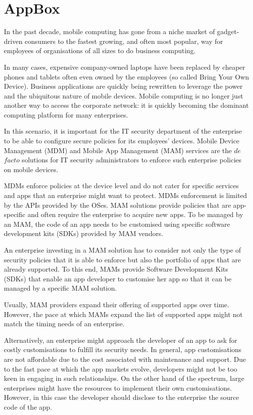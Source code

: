 \chapter{AppBox}
In the past decade, mobile computing has gone from a niche market of gadget-driven consumers to the fastest growing, and often most popular, way for employees of organisations of all sizes to do business computing. 

In many cases, expensive company-owned laptops have been replaced by cheaper phones and tablets often even owned by the employees (so called Bring Your Own Device). Business applications are quickly being rewritten to leverage the power and the ubiquitous nature of mobile devices. Mobile computing is no longer just another way to access the corporate network: it is quickly becoming the dominant computing platform for many enterprises.
  
In this scenario, it is important for the IT security department of the enterprise to be able to configure secure policies for its employees' devices. Mobile Device Management (MDM) and Mobile App Management (MAM) services are the $de$ $facto$ solutions for IT security administrators to enforce such enterprise policies on mobile devices.

MDMs enforce policies at the device level and do not cater for specific services and apps that an enterprise might want to protect. MDMs enforcement is  limited by the APIs  provided by the OSes. MAM solutions provide policies that are app-specific and often require the enterprise to acquire new apps. To be managed by an MAM, the code of an app needs to be customised using specific software development kits (SDKs) provided by MAM vendors. 

An enterprise investing in a MAM solution has to consider not only the type of security policies that it is able to enforce but also the portfolio of apps that are already supported. To this end, MAMs provide Software Development Kits (SDKs) that enable an app developer to customise her app so that it can be managed by a specific MAM solution.  

Usually, MAM providers expand their offering of supported apps over time. 
However, the pace at which MAMs expand the list of  supported apps might not match the timing needs of an enterprise. 

Alternatively, an enterprise might approach the  developer of an app to ask for costly customisations to fulfill its security needs. In general, app customisations are not affordable due to the cost associated with maintenance and support. Due to the fast pace at which the app markets evolve, developers might not be too keen in engaging in such relationships. On the other hand of the spectrum, large enterprises might have the resources to implement their own customisations. However, in this case the developer should disclose to the enterprise the source code of the app. 
   

